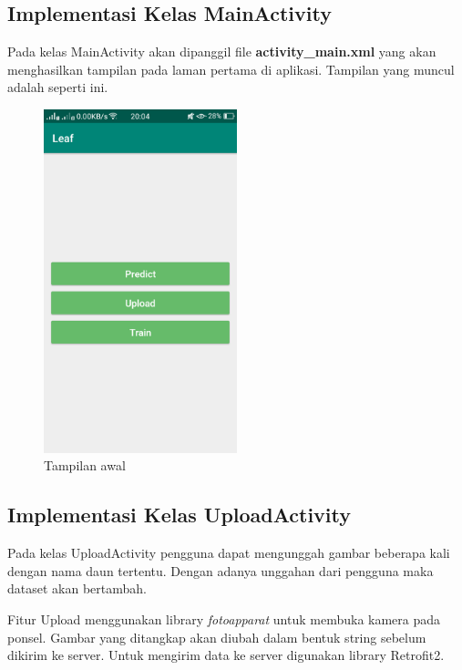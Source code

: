 \subsection{Implementasi Kelas MainActivity}
\par Pada kelas MainActivity akan dipanggil file \textbf{activity\_main.xml} yang akan menghasilkan tampilan pada laman pertama di aplikasi. Tampilan yang muncul adalah seperti ini.
\begin{figure}[H]
	\centering\includegraphics[width=0.5\textwidth]{bab4/figures/main.png}
	\caption{Tampilan awal}
	\label{fig:main}
\end{figure}
\subsection{Implementasi Kelas UploadActivity}
\par Pada kelas UploadActivity pengguna dapat mengunggah gambar beberapa kali dengan nama daun tertentu. Dengan adanya unggahan dari pengguna maka dataset akan bertambah.

\par Fitur Upload menggunakan library \textit{fotoapparat} untuk membuka kamera pada ponsel. Gambar yang ditangkap akan diubah dalam bentuk string sebelum dikirim ke server. Untuk mengirim data ke server digunakan library Retrofit2.


